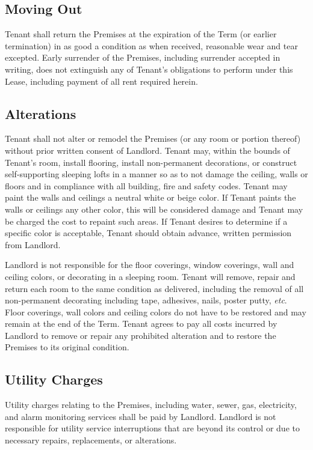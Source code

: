 \documentclass{article}
\begin{document}
\subsection{Moving Out}
Tenant shall return the Premises at the expiration of the Term (or earlier
termination) in as good a condition as when received, reasonable wear and tear
excepted. Early surrender of the Premises, including surrender accepted in
writing, does not extinguish any of Tenant’s obligations to perform under this
Lease, including payment of all rent required herein.

\subsection{Alterations}
Tenant shall not alter or remodel the Premises (or any room or portion thereof)
without prior written consent of Landlord. Tenant may, within the bounds of
Tenant’s room, install flooring, install non-permanent decorations, or construct
self-supporting sleeping lofts in a manner so as to not damage the ceiling,
walls or floors and in compliance with all building, fire and safety codes.
Tenant may paint the walls and ceilings a neutral white or beige color. If
Tenant paints the walls or ceilings any other color, this will be considered
damage and Tenant may be charged the cost to repaint such areas. If Tenant
desires to determine if a specific color is acceptable, Tenant should obtain
advance, written permission from Landlord.

Landlord is not responsible for the floor coverings, window coverings, wall and
ceiling colors, or decorating in a sleeping room. Tenant will remove, repair and
return each room to the same condition as delivered, including the removal of
all non-permanent decorating including tape, adhesives, nails, poster putty,
\textit{etc}. Floor coverings, wall colors and ceiling colors do not have to be
restored and may remain at the end of the Term. Tenant agrees to pay all costs
incurred by Landlord to remove or repair any prohibited alteration and to
restore the Premises to its original condition.

\subsection{Utility Charges}
Utility charges relating to the Premises, including water, sewer, gas,
electricity, and alarm monitoring services shall be paid by Landlord. Landlord
is not responsible for utility service interruptions that are beyond its control
or due to necessary repairs, replacements, or alterations.
\end{document}
